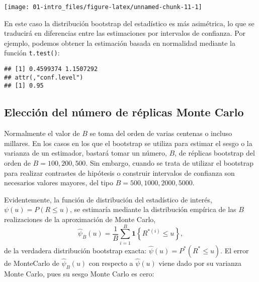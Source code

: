 \documentclass[
]{book}
\newenvironment{Shaded}{\begin{snugshade}}{\end{snugshade}}
\newcommand{\KeywordTok}[1]{\textcolor[rgb]{0.13,0.29,0.53}{\textbf{#1}}}
\newcommand{\NormalTok}[1]{#1}
\newcommand{\OperatorTok}[1]{\textcolor[rgb]{0.81,0.36,0.00}{\textbf{#1}}}
\theoremstyle{break}
\theoremstyle{definition}
\theoremstyle{definition}
\theoremstyle{definition}
\theoremstyle{remark}
\begin{document}
\begin{center}\texttt{[image: 01-intro\_files/figure-latex/unnamed-chunk-11-1]} \end{center}

En este caso la distribución bootstrap del estadístico es más asimétrica, lo que se traducirá en diferencias entre las estimaciones por intervalos de confianza.
Por ejemplo, podemos obtener la estimación basada en normalidad mediante la función \texttt{t.test()}:

\begin{Shaded}
\end{Shaded}

\begin{verbatim}
## [1] 0.4599374 1.1507292
## attr(,"conf.level")
## [1] 0.95
\end{verbatim}

\hypertarget{elecciuxf3n-del-nuxfamero-de-ruxe9plicas-monte-carlo}{%
\subsection{Elección del número de réplicas Monte Carlo}\label{elecciuxf3n-del-nuxfamero-de-ruxe9plicas-monte-carlo}}

Normalmente el valor de \(B\) se toma del orden de varias centenas o
incluso millares. En los casos en los que el bootstrap se utiliza para
estimar el sesgo o la varianza de un estimador, bastará tomar un número,
\(B\), de réplicas bootstrap del orden de \(B = 100, 200, 500\). Sin embargo,
cuando se trata de utilizar el bootstrap para realizar contrastes de
hipótesis o construir intervalos de confianza son necesarios valores
mayores, del tipo \(B = 500, 1000, 2000, 5000\).

Evidentemente, la función de distribución del estadístico de interés,
\(\psi \left( u \right) =P\left( R\leq u \right)\), se estimaría mediante
la distribución empírica de las \(B\) realizaciones de la aproximación de
Monte Carlo,
\[\hat{\psi}_{B}\left( u \right) =
\frac{1}{B}\sum_{i=1}^{B}\mathbf{1}\left\{ R^{\ast (i)}\leq u\right\},\]
de la verdadera distribución bootstrap exacta:
\(\hat{\psi}\left(u \right) =P^{\ast}\left( R^{\ast}\leq u \right)\).
El error de MonteCarlo de \(\hat{\psi}_{B}\left( u \right)\) con respecto
a \(\hat{\psi}\left( u \right)\) viene dado por su varianza Monte Carlo,
pues su sesgo Monte Carlo es cero:
\end{document}

